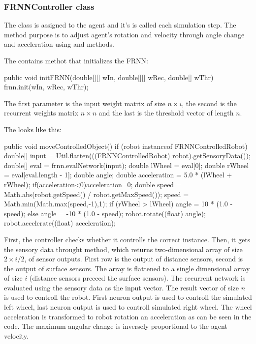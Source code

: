 \subsubsection{FRNNController class}

The  class is assigned to the agent and it's  is called each simulation step. The method purpose is to adjust agent's rotation and velocity through angle change and acceleration using  and      methods. 

The  contains  methot that initializes the FRNN:
\begin{colorverbatim}
public void initFRNN(double[][] wIn, double[][] wRec, double[] wThr) {
    frnn.init(wIn, wRec, wThr);
}
\end{colorverbatim}
The first parameter is the input weight matrix of size $n \times i$, the second is the recurrent weights matrix $n \times n$ and the last is the threshold vector of length $n$.

The  looks like this:
\begin{colorverbatim}
public void moveControlledObject() {
    if (robot instanceof FRNNControlledRobot) {
        double[] input = Util.flatten(((FRNNControlledRobot) robot).getSensoryData());
        double[] eval = frnn.evalNetwork(input);
        double lWheel = eval[0];
        double rWheel = eval[eval.length - 1];
        double angle;
        double acceleration = 5.0 * (lWheel + rWheel);
        if(acceleration<0)acceleration=0;
        double speed = Math.abs(robot.getSpeed() / robot.getMaxSpeed());
        speed = Math.min(Math.max(speed,-1),1);
        if (rWheel > lWheel) { angle = 10 * (1.0 - speed); }
            else {angle = -10 * (1.0 - speed);}
        robot.rotate((float) angle);
        robot.accelerate((float) acceleration);
    }
}
\end{colorverbatim}
First, the controller checks whether it controlls the correct instance. Then, it gets the sensory data throught  method, which returns two-dimensional array of size $2 \times i/2$, of sensor outputs. First row is the output of distance sensors, second is the output of surface sensors. The array is flattened to a single dimensional array of size $i$ (distance sensors preceed the surface sensors). The recurrent network is evaluated using the sensory data as the input vector. The result vector of size $n$ is used to controll the robot. First neuron output is used to controll the simulated left wheel, last neuron output is used to controll simulated right wheel. The wheel acceleration is transformed to robot rotation an acceleration as can be seen in the code. The maximum angular change is inversely proportional to the agent velocity.

